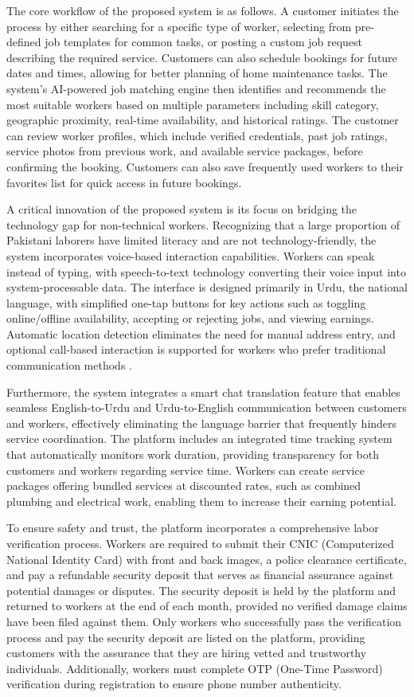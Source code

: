 \documentclass[12pt,a4paper]{report}
\begin{document}
The core workflow of the proposed system is as follows. A customer initiates the process by either searching for a specific type of worker, selecting from pre-defined job templates for common tasks, or posting a custom job request describing the required service. Customers can also schedule bookings for future dates and times, allowing for better planning of home maintenance tasks. The system's AI-powered job matching engine then identifies and recommends the most suitable workers based on multiple parameters including skill category, geographic proximity, real-time availability, and historical ratings. The customer can review worker profiles, which include verified credentials, past job ratings, service photos from previous work, and available service packages, before confirming the booking. Customers can also save frequently used workers to their favorites list for quick access in future bookings.

A critical innovation of the proposed system is its focus on bridging the technology gap for non-technical workers. Recognizing that a large proportion of Pakistani laborers have limited literacy and are not technology-friendly, the system incorporates voice-based interaction capabilities. Workers can speak instead of typing, with speech-to-text technology converting their voice input into system-processable data. The interface is designed primarily in Urdu, the national language, with simplified one-tap buttons for key actions such as toggling online/offline availability, accepting or rejecting jobs, and viewing earnings. Automatic location detection eliminates the need for manual address entry, and optional call-based interaction is supported for workers who prefer traditional communication methods \cite{ahmed2021}.

Furthermore, the system integrates a smart chat translation feature that enables seamless English-to-Urdu and Urdu-to-English communication between customers and workers, effectively eliminating the language barrier that frequently hinders service coordination. The platform includes an integrated time tracking system that automatically monitors work duration, providing transparency for both customers and workers regarding service time. Workers can create service packages offering bundled services at discounted rates, such as combined plumbing and electrical work, enabling them to increase their earning potential.

To ensure safety and trust, the platform incorporates a comprehensive labor verification process. Workers are required to submit their CNIC (Computerized National Identity Card) with front and back images, a police clearance certificate, and pay a refundable security deposit that serves as financial assurance against potential damages or disputes. The security deposit is held by the platform and returned to workers at the end of each month, provided no verified damage claims have been filed against them. Only workers who successfully pass the verification process and pay the security deposit are listed on the platform, providing customers with the assurance that they are hiring vetted and trustworthy individuals. Additionally, workers must complete OTP (One-Time Password) verification during registration to ensure phone number authenticity.
\end{document}
